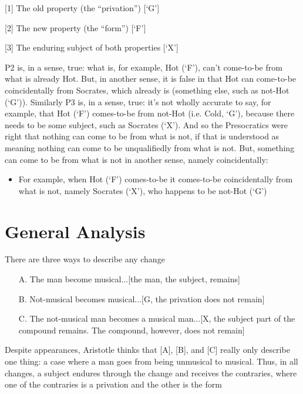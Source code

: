 \documentclass[oneside]{article}
\begin{document}
[1] The old property (the ``privation'') [`G']
\vspace*{1mm}

[2] The new property (the ``form'') [`F']
\vspace*{1mm}

[3] The enduring subject of both properties [`X']
\vspace*{2mm}

\noindent P2 is, in a sense, true: what is, for example, Hot (`F'), can't come-to-be from what is already Hot. But, in another sense, it is false in that Hot can come-to-be coincidentally from Socrates, which already is (something else, such as not-Hot (`G')).   
\vspace*{2mm}
\noindent Similarly P3 is, in a sense, true: it's not wholly accurate to say, for example, that Hot (`F') comes-to-be from not-Hot (i.e. Cold, `G'), because there needs to be some subject, such as Socrates (`X'). And so the Presocratics were right that nothing can come to be from what is not, if that is understood as meaning nothing can come to be unqualifiedly from what is not. But, something can come to be from what is not in another sense, namely coincidentally:
\begin{itemize}
\item For example, when Hot (`F') comes-to-be it comes-to-be coincidentally from what is not, namely Socrates (`X'), who happens to be not-Hot (`G')
\end{itemize}

\section*{General Analysis}

\noindent There are three ways to describe any change

\begin{enumerate}

\item[A.] The man become musical...[the man, the subject, remains]

\item[B.] Not-musical becomes musical...[G, the privation does not remain] 

\item[C.]The not-musical man becomes a musical man...[X, the subject part of the compound remains. The compound, however, does not remain]
\end{enumerate}
\noindent Despite appearances, Aristotle thinks that [A], [B], and [C] really only describe one thing: a case where a man goes from being unmusical to musical. Thus, in all changes, a subject endures through the change and receives the contraries, where one of the contraries is a privation and the other is the form
\vspace*{2mm}
\end{document}
